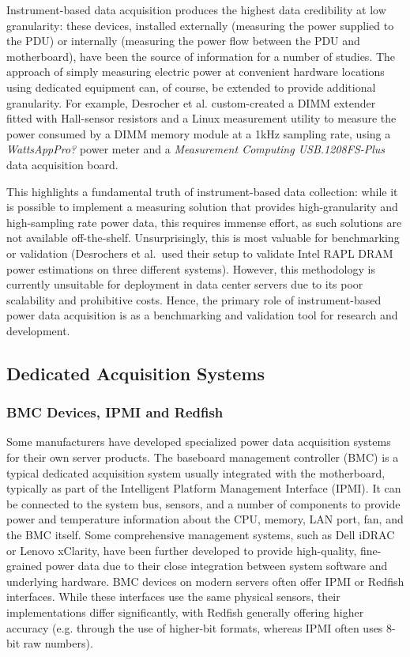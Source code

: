Instrument-based data acquisition produces the highest data credibility at low granularity: these devices, installed externally (measuring the power supplied to the PDU) or internally (measuring the power flow between the PDU and motherboard), have been the source of information for a number of studies. The approach of simply measuring electric power at convenient hardware locations using dedicated equipment can, of course, be extended to provide additional granularity. For example, Desrocher et al.\parencite{desrochers2016validation} custom-created a DIMM extender fitted with Hall-sensor resistors and a Linux measurement utility to measure the power consumed by a DIMM memory module at a 1kHz sampling rate, using a \textit{WattsAppPro?} power meter and a \textit{Measurement Computing USB.1208FS-Plus} data acquisition board.

This highlights a fundamental truth of instrument-based data collection: while it is possible to implement a measuring solution that provides high-granularity and high-sampling rate power data, this requires immense effort, as such solutions are not available off-the-shelf. Unsurprisingly, this is most valuable for benchmarking or validation (Desrochers et al.\ used their setup to validate Intel RAPL DRAM power estimations on three different systems). However, this methodology is currently unsuitable for deployment in data center servers due to its poor scalability and prohibitive costs. Hence, the primary role of instrument-based power data acquisition is as a benchmarking and validation tool for research and development.

\subsection{Dedicated Acquisition Systems}

\subsubsection{BMC Devices, IPMI and Redfish}
\label{sec:BMC_devices}

Some manufacturers have developed specialized power data acquisition systems for their own server products. The baseboard management controller (BMC) is a typical dedicated acquisition system usually integrated with the motherboard, typically as part of the Intelligent Platform Management Interface (IPMI)\parencite{lin2020taxonomy}. It can be connected to the system bus, sensors, and a number of components to provide power and temperature information about the CPU, memory, LAN port, fan, and the BMC itself. Some comprehensive management systems, such as Dell iDRAC or Lenovo xClarity, have been further developed to provide high-quality, fine-grained power data due to their close integration between system software and underlying hardware. BMC devices on modern servers often offer IPMI or Redfish interfaces. While these interfaces use the same physical sensors, their implementations differ significantly, with Redfish generally offering higher accuracy (e.g. through the use of higher-bit formats, whereas IPMI often uses 8-bit raw numbers).

